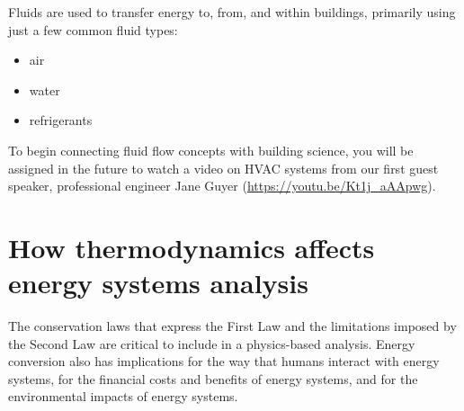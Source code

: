 \documentclass[10pt]{article}
\begin{document}
Fluids are used to transfer energy to, from, and within buildings, primarily using just a few common fluid types:

\begin{itemize}[noitemsep]%
\item air
\item water 
\item refrigerants
\end{itemize}

To begin connecting fluid flow concepts with building science, you will be assigned in the future to watch a video on HVAC systems from our first guest speaker, professional engineer Jane Guyer  (\url{https://youtu.be/Kt1j_aAApwg}).


\section{How thermodynamics affects energy systems analysis}

The conservation laws that express the First Law and the limitations imposed by the Second Law are critical to include in a physics-based analysis. Energy conversion also has implications for the way that humans interact with energy systems, for the financial costs and benefits of energy systems, and for the environmental impacts of energy systems.







\end{document}
